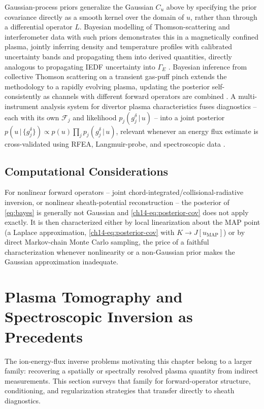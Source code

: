Gaussian-process priors generalize the Gaussian $C_u$ above by specifying the prior covariance directly as a smooth kernel over the domain of $u$, rather than through a differential operator $L$. Bayesian modelling of Thomson-scattering and interferometer data with such priors demonstrates this in a magnetically confined plasma, jointly inferring density and temperature profiles with calibrated uncertainty bands and propagating them into derived quantities, directly analogous to propagating IEDF uncertainty into $\Gamma_{E}$ \cite{ref0683}. Bayesian inference from collective Thomson scattering on a transient gas-puff pinch extends the methodology to a rapidly evolving plasma, updating the posterior self-consistently as channels with different forward operators are combined \cite{ref0684}. A multi-instrument analysis system for divertor plasma characteristics fuses diagnostics -- each with its own $\mathcal{F}_j$ and likelihood $p_j(g_j^{\delta}\,|\,u)$ -- into a joint posterior $p(u\,|\,\{g_j^{\delta}\}) \propto p(u) \prod_j p_j(g_j^{\delta}\,|\,u)$, relevant whenever an energy flux estimate is cross-validated using RFEA, Langmuir-probe, and spectroscopic data \cite{ref0685}.

\subsection{Computational Considerations}

For nonlinear forward operators -- joint chord-integrated/collisional-radiative inversion, or nonlinear sheath-potential reconstruction -- the posterior of \cref{eq:bayes} is generally not Gaussian and \cref{ch14-eq:posterior-cov} does not apply exactly. It is then characterized either by local linearization about the MAP point (a Laplace approximation, \cref{ch14-eq:posterior-cov} with $K \to J[u_{\mathrm{MAP}}]$) or by direct Markov-chain Monte Carlo sampling, the price of a faithful characterization whenever nonlinearity or a non-Gaussian prior makes the Gaussian approximation inadequate.

\section{Plasma Tomography and Spectroscopic Inversion as Precedents}
\label{sec:tomography}

The ion-energy-flux inverse problems motivating this chapter belong to a larger family: recovering a spatially or spectrally resolved plasma quantity from indirect measurements. This section surveys that family for forward-operator structure, conditioning, and regularization strategies that transfer directly to sheath diagnostics.

